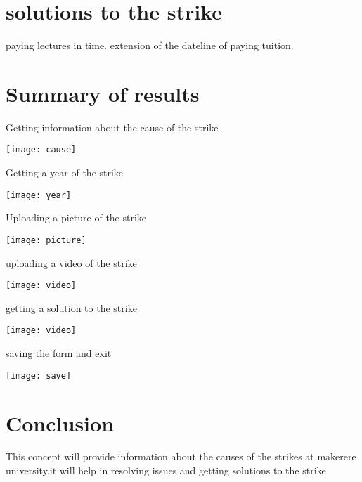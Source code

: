 \documentclass{article}
\begin{document}
\section{solutions to the strike}
paying lectures in time.
extension of the dateline of paying tuition.

\section{Summary of results}

Getting information about the cause of the strike

\graphicspath{ {images/} }

\texttt{[image: cause]}


Getting a year of the strike

\graphicspath{ {images/} }

\texttt{[image: year]}

 Uploading a picture of the strike


\graphicspath{ {images/} }

\texttt{[image: picture]}

 uploading a video of the strike

\graphicspath{ {images/} }

\texttt{[image: video]}
  
getting a solution to the strike


\graphicspath{ {images/} }

\texttt{[image: video]}

saving the form and exit

\graphicspath{ {images/} }

\texttt{[image: save]}

  

\section{Conclusion}
This concept will provide information about the causes of the strikes at makerere university.it will help in resolving issues and getting solutions to the strike
\end{document}
